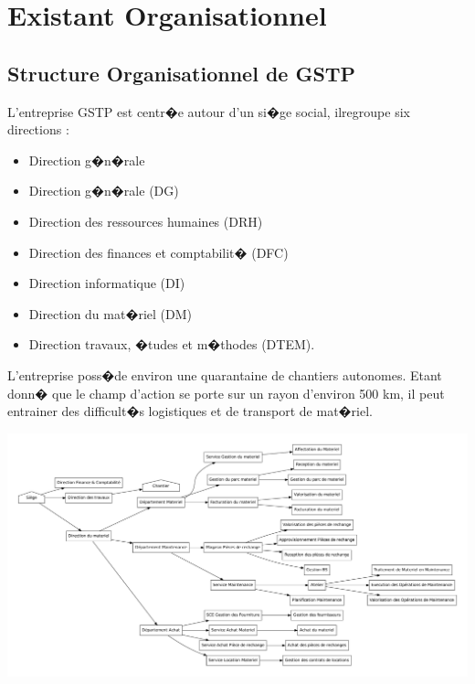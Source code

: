\documentclass{article}
\begin{document}
\section{Existant Organisationnel}
    \subsection{Structure Organisationnel de GSTP}

		L'entreprise GSTP est centr�e autour d'un si�ge social, ilregroupe six directions :
				\begin{itemize}
        \item Direction g�n�rale
        \item Direction g�n�rale (DG)
				\item Direction des ressources humaines (DRH)
				\item Direction des finances et comptabilit� (DFC)
				\item Direction informatique (DI)
				\item Direction du mat�riel (DM)
				\item Direction travaux, �tudes et m�thodes (DTEM).
    \end{itemize}
    L'entreprise poss�de environ une quarantaine de chantiers autonomes. Etant donn� que le
champ d'action se porte sur un rayon d'environ 500 km, il peut entrainer des difficult�s logistiques
et de transport de mat�riel.

		\includegraphics[width=\textwidth]{img/structureOrganisationnel.pdf} 
		
\end{document}
